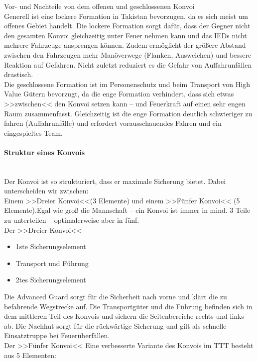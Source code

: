 Vor- und Nachteile von dem offenen und geschlossenen Konvoi \\
	Generell ist eine lockere Formation in Takistan bevorzugen, da es sich meist um offenes Gebiet handelt. Die lockere Formation sorgt dafür, dass der Gegner nicht den gesamten Konvoi gleichzeitig unter Feuer nehmen kann und das IEDs nicht mehrere Fahrzeuge ansprengen können. Zudem ermöglicht der größere Abstand zwischen den Fahrzeugen mehr Manöverwege (Flanken, Ausweichen) und bessere Reaktion auf Gefahren. Nicht zuletzt reduziert es die Gefahr von Auffahrunfällen drastisch.  \\
	Die geschlossene Formation ist im Personenschutz und beim Transport von High Value Gütern bevorzugt, da die enge Formation verhindert, dass sich etwas >>zwischen<< den Konvoi setzen kann – und Feuerkraft auf einen sehr engen Raum zusammenfasst. Gleichzeitig ist die enge Formation deutlich schwieriger zu fahren (Auffahrunfälle) und erfordert vorausschauendes Fahren und ein eingespieltes Team. \\

\paragraph{Struktur eines Konvois} \ \\
	Der Konvoi ist so strukturiert, dass er maximale Sicherung bietet. Dabei unterscheiden wir zwischen: \\
	Einem >>Dreier Konvoi<<(3 Elemente) und einem >>Fünfer Konvoi<< (5 Elemente).Egal wie groß die Mannschaft – ein Konvoi ist immer in mind. 3 Teile zu unterteilen – optimalerweise aber in fünf.  \\
Der >>Dreier Konvoi<<

	\begin{itemize}
		\item 1ste Sicherungselement
		\item Transport und Führung
		\item 2tes Sicherungselement
	\end{itemize}

	Die  Advanced Guard sorgt für die Sicherheit nach vorne und klärt die zu befahrende Wegstrecke auf. Die Transportgüter und die Führung befinden sich in dem mittleren Teil des Konvois und sichern die Seitenbereiche rechts und links ab. Die Nachhut sorgt für die rückwärtige Sicherung und gilt als schnelle Einsatztruppe bei Feuerüberfällen. \\
Der >>Fünfer Konvoi<<
Eine verbesserte Variante des Konvois im TTT besteht aus 5 Elementen:

